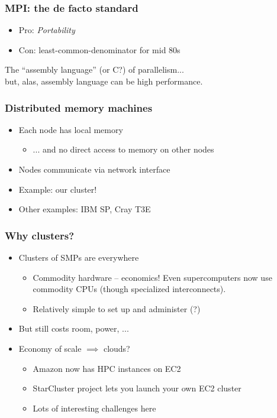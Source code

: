 \documentclass{beamer}
\begin{document}
\begin{frame}
  \frametitle{MPI: the de facto standard}

  \begin{itemize}
  \item Pro: {\em Portability}
  \item Con: least-common-denominator for mid 80s
  \end{itemize}
  The ``assembly language'' (or C?) of parallelism... \\
  \hspace{5mm} but, alas, assembly language can be high performance.

\end{frame}


\begin{frame}
  \frametitle{Distributed memory machines}
  
  \begin{itemize}
  \item Each node has local memory
    \begin{itemize}
    \item ... and no direct access to memory on other nodes
    \end{itemize}
  \item Nodes communicate via network interface
  \item Example: our cluster!
  \item Other examples: IBM SP, Cray T3E
  \end{itemize}
\end{frame}


\begin{frame}
  \frametitle{Why clusters?}

  \begin{itemize}
  \item Clusters of SMPs are everywhere
    \begin{itemize}
    \item Commodity hardware -- economics!  Even supercomputers
      now use commodity CPUs (though specialized interconnects).
    \item Relatively simple to set up and administer (?)
    \end{itemize}
  \item But still costs room, power, ...
  \item Economy of scale $\implies$ clouds?
    \begin{itemize}
    \item Amazon now has HPC instances on EC2
    \item StarCluster project lets you launch your own EC2 cluster
    \item Lots of interesting challenges here
    \end{itemize}
  \end{itemize}
\end{frame}




\end{document}
